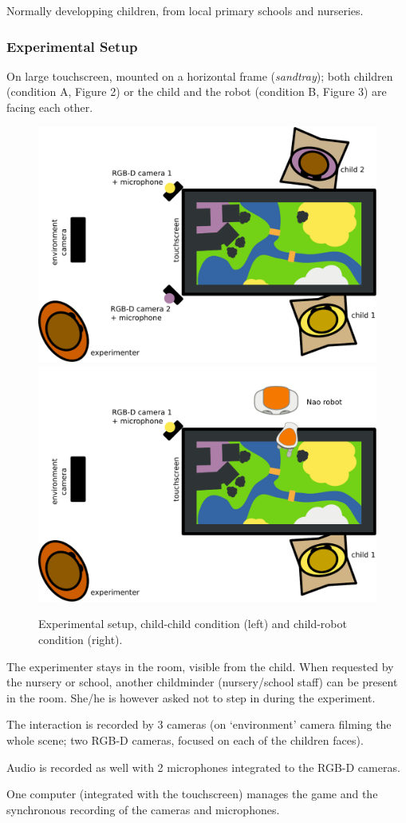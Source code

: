 \documentclass{article}
\begin{document}
Normally developping children, from local primary schools and nurseries.



\subsubsection{Experimental Setup}\label{experimental-setup}

On large touchscreen, mounted on a horizontal frame (\emph{sandtray});
both children (condition A, Figure 2) or the child and the robot
(condition B, Figure 3) are facing each other.

\begin{figure}[htbp]
    \centering
    \includegraphics[width=0.4\linewidth]{setup_child_child_top}
    \hspace{1.5cm}
    \includegraphics[width=0.4\linewidth]{setup_child_robot_top}
    \caption{Experimental setup, child-child condition (left) and child-robot
    condition (right).}
\end{figure}

The experimenter stays in the room, visible from the child. When
requested by the nursery or school, another childminder (nursery/school
staff) can be present in the room. She/he is however asked not to step
in during the experiment.

The interaction is recorded by 3 cameras (on `environment' camera
filming the whole scene; two RGB-D cameras, focused on each of the
children faces).

Audio is recorded as well with 2 microphones integrated to the RGB-D
cameras.

One computer (integrated with the touchscreen) manages the game and the
synchronous recording of the cameras and microphones.
\end{document}
